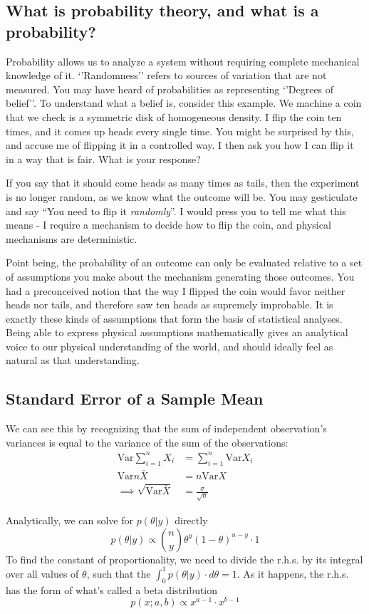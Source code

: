 \documentclass[11pt,a4paper,article]{memoir} %
\begin{document}
\subsection{What is probability theory, and what is a probability?}
Probability allows us to analyze a system without requiring complete mechanical knowledge of it. `'Randomness'' refers to sources of variation that are not measured. You may have heard of probabilities as representing `'Degrees of belief''. To understand what a belief is, consider this example. We machine a coin that we check is a symmetric disk of homogeneous density. I flip the coin ten times, and it comes up heads every single time. You might be surprised by this, and accuse me of flipping it in a controlled way. I then ask you how I can flip it in a way that is fair. What is your response?
\par
If you say that it should come heads as many times as tails, then the experiment is no longer random, as we know what the outcome will be. You may gesticulate and say ``You need to flip it \emph{randomly}''. I would press you to tell me what this means - I require a mechanism to decide how to flip the coin, and physical mechanisms are deterministic.
\par
Point being, the probability of an outcome can only be evaluated relative to a set of assumptions you make about the mechanism generating those outcomes. You had a preconceived notion that the way I flipped the coin would favor neither heads nor tails, and therefore saw ten heads as supremely improbable. It is exactly these kinds of assumptions that form the basis of statistical analyses. Being able to express physical assumptions mathematically gives an analytical voice to our physical understanding of the world, and should ideally feel as natural as that understanding.
\newpage

\subsection{Standard Error of a Sample Mean}
We can see this by recognizing that the sum of independent observation's variances is equal to the variance of the sum of the observations:
\begin{align}
 \text{Var}\sum_{i = 1}^n X_i &= \sum_{i = 1}^n \text{Var}X_i\\
	\text{Var}n\bar{X} &= n\text{Var}X \\
	\implies \sqrt{\text{Var}\bar{X}} &= \frac{\sigma}{\sqrt{n}}
\end{align}
\par
Analytically, we can solve for $p(\theta|y)$ directly
\[
  p(\theta|y) \propto \binom{n}{y}\theta^y (1 - \theta)^{n-y}\cdot 1
\]
To find the constant of proportionality, we need to divide the r.h.s. by its integral over all values of $\theta$, such that the $\int_0^1 p(\theta|y)\cdot d\theta = 1$. As it happens, the r.h.s. has the form of what's called a beta distribution
\[
  p(x; a, b) \propto x^{a - 1}\cdot x^{b-1}
\]
\end{document}
